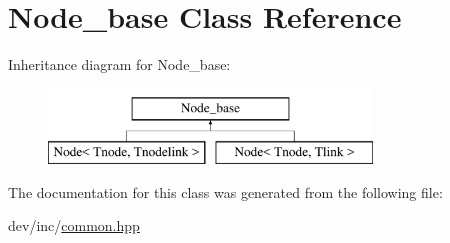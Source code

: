 \hypertarget{classNode__base}{\section{Node\-\_\-base Class Reference}
\label{classNode__base}
}
Inheritance diagram for Node\-\_\-base\-:\begin{figure}[H]
\begin{center}
\leavevmode
\includegraphics[height=2.000000cm]{classNode__base}
\end{center}
\end{figure}


The documentation for this class was generated from the following file\-:\begin{DoxyCompactItemize}
\item 
dev/inc/\hyperlink{common_8hpp}{common.\-hpp}\end{DoxyCompactItemize}
